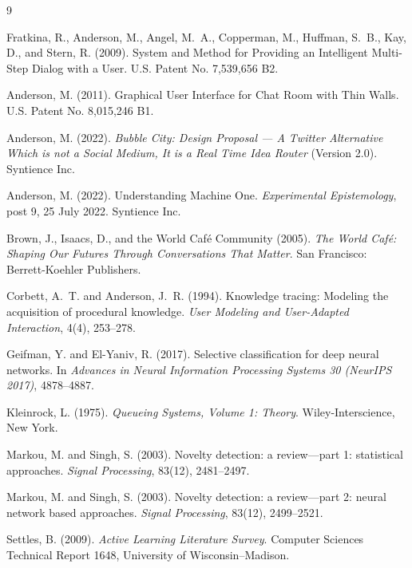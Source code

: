 \documentclass[11pt]{article}
\begin{document}
\begin{thebibliography}{9}

Fratkina, R., Anderson, M., Angel, M.~A., Copperman, M., Huffman, S.~B., Kay, D., and Stern, R. (2009). System and Method for Providing an Intelligent Multi-Step Dialog with a User. U.S. Patent No. 7,539,656 B2.

Anderson, M. (2011). Graphical User Interface for Chat Room with Thin Walls. U.S. Patent No. 8,015,246 B1.

Anderson, M. (2022). \textit{Bubble City: Design Proposal --- A Twitter Alternative Which is not a Social Medium, It is a Real Time Idea Router} (Version 2.0). Syntience Inc.

Anderson, M. (2022). Understanding Machine One. \textit{Experimental Epistemology}, post 9, 25 July 2022. Syntience Inc.

Brown, J., Isaacs, D., and the World Café Community (2005). \textit{The World Café: Shaping Our Futures Through Conversations That Matter}. San Francisco: Berrett-Koehler Publishers.

Corbett, A.~T. and Anderson, J.~R. (1994). Knowledge tracing: Modeling the acquisition of procedural knowledge. \textit{User Modeling and User-Adapted Interaction}, 4(4), 253--278.

Geifman, Y. and El-Yaniv, R. (2017). Selective classification for deep neural networks. In \textit{Advances in Neural Information Processing Systems 30 (NeurIPS 2017)}, 4878--4887.

Kleinrock, L. (1975). \textit{Queueing Systems, Volume 1: Theory}. Wiley-Interscience, New York.

Markou, M. and Singh, S. (2003). Novelty detection: a review---part 1: statistical approaches. \textit{Signal Processing}, 83(12), 2481--2497.

Markou, M. and Singh, S. (2003). Novelty detection: a review---part 2: neural network based approaches. \textit{Signal Processing}, 83(12), 2499--2521.

Settles, B. (2009). \textit{Active Learning Literature Survey}. Computer Sciences Technical Report 1648, University of Wisconsin--Madison.

\end{thebibliography}
\end{document}
